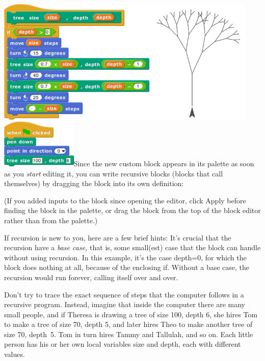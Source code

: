 \includegraphics[width=2.96528in,height=2.36319in]{media/image514.png}\includegraphics[width=1.95833in,height=2.35417in]{media/image515.png}\includegraphics[width=1.42361in,height=0.91181in]{media/image516.png}Since
the new custom block appears in its palette as soon as you \emph{start}
editing it, you can write recursive blocks (blocks that call themselves)
by dragging the block into its own definition:

(If you added inputs to the block since opening the editor, click Apply
before finding the block in the palette, or drag the block from the top
of the block editor rather than from the palette.)

If recursion is new to you, here are a few brief hints: It's crucial
that the recursion have a \emph{base case,} that is, some small(est)
case that the block can handle without using recursion. In this example,
it's the case depth=0, for which the block does nothing at all, because
of the enclosing if. Without a base case, the recursion would run
forever, calling itself over and over.

Don't try to trace the exact sequence of steps that the computer follows
in a recursive program. Instead, imagine that inside the computer there
are many small people, and if Theresa is drawing a tree of size 100,
depth 6, she hires Tom to make a tree of size 70, depth 5, and later
hires Theo to make another tree of size 70, depth~5. Tom in turn hires
Tammy and Tallulah, and so on. Each little person has his or her own
local variables size and depth, each with different values.

